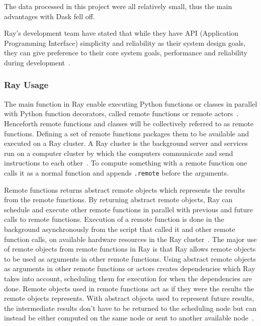 \documentclass[12pt, a4paper]{article}
\begin{document}
The data processed in this project were all relatively small, thus the main advantages with Dask fell off.

Ray's development team have stated that while they have API (Application Programming Interface) simplicity and reliability as their system design goals, they can give preference to their core system goals, performance and reliability during development~\cite{ray:Architecture}.


\subsubsection{Ray Usage}

The main function in Ray enable executing Python functions or classes in parallel with Python function decorators, called remote functions or remote actors~\cite{ray:remoteFunctions, ray:remoteClasses}.
Henceforth remote functions and classes will be collectively referred to as remote functions.
Defining a set of remote functions packages them to be available and executed on a Ray cluster.
A Ray cluster is the background server and services run on a computer cluster by which the computers communicate and send instructions to each other~\cite{ray:rayCluster}.%
To compute something with a remote function one calls it as a normal function and appends \texttt{.remote} before the arguments. 

Remote functions returns abstract remote objects which represents the results from the remote functions.
By returning abstract remote objects, Ray can schedule and execute other remote functions in parallel with previous and future calls to remote functions.
Execution of a remote function is done in the background asynchronously from the script that called it and other remote function calls, on available hardware resources in the Ray cluster~\cite{ray:remoteFunctions}.
The major use of remote objects from remote functions in Ray is that Ray allows remote objects to be used as arguments in other remote functions.
Using abstract remote objects as arguments in other remote functions or actors creates dependencies which Ray takes into account, scheduling them for execution for when the dependencies are done.
Remote objects used in remote functions act as if they were the results the remote objects represents.
With abstract objects used to represent future results, the intermediate results don't have to be returned to the scheduling node but can instead be either computed on the same node or sent to another available node~\cite{ray:remoteObjects}.
\end{document}
